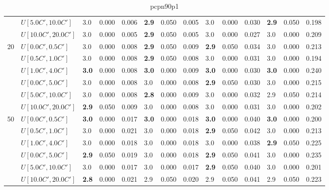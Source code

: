 \begin{table}[h]
{\begin{tabular}{|l|l||l|l|l||l|l|l||l|l|l||l|l|l|}
       & $U[5.0C',10.0C']$ & 3.0 & 0.000 & 0.006 & \textbf{2.9} & 0.050 & 0.005 & 3.0 & 0.000 & 0.030 & \textbf{2.9} & 0.050 & 0.198 \\
       & $U[10.0C',20.0C']$ & 3.0 & 0.000 & 0.005 & \textbf{2.9} & 0.050 & 0.005 & 3.0 & 0.000 & 0.027 & 3.0 & 0.000 & 0.209 \\
      \hline\hline
      \multirow{6}{*}{20} & $U[0.0C',0.5C']$ & 3.0 & 0.000 & 0.008 & \textbf{2.9} & 0.050 & 0.009 & \textbf{2.9} & 0.050 & 0.034 & 3.0 & 0.000 & 0.213 \\
       & $U[0.5C',1.0C']$ & 3.0 & 0.000 & 0.008 & \textbf{2.9} & 0.050 & 0.008 & 3.0 & 0.000 & 0.031 & 3.0 & 0.000 & 0.194 \\
       & $U[1.0C',4.0C']$ & \textbf{3.0} & 0.000 & 0.008 & \textbf{3.0} & 0.000 & 0.009 & \textbf{3.0} & 0.000 & 0.030 & \textbf{3.0} & 0.000 & 0.240 \\
       & $U[0.0C',5.0C']$ & 3.0 & 0.000 & 0.008 & 3.0 & 0.000 & 0.008 & \textbf{2.9} & 0.050 & 0.030 & 3.0 & 0.000 & 0.215 \\
       & $U[5.0C',10.0C']$ & 3.0 & 0.000 & 0.008 & \textbf{2.8} & 0.000 & 0.009 & 3.0 & 0.000 & 0.032 & 2.9 & 0.050 & 0.214 \\
       & $U[10.0C',20.0C']$ & \textbf{2.9} & 0.050 & 0.009 & 3.0 & 0.000 & 0.008 & 3.0 & 0.000 & 0.031 & 3.0 & 0.000 & 0.202 \\
      \hline\hline
      \multirow{6}{*}{50} & $U[0.0C',0.5C']$ & \textbf{3.0} & 0.000 & 0.017 & \textbf{3.0} & 0.000 & 0.018 & \textbf{3.0} & 0.000 & 0.040 & \textbf{3.0} & 0.000 & 0.200 \\
       & $U[0.5C',1.0C']$ & 3.0 & 0.000 & 0.021 & 3.0 & 0.000 & 0.018 & \textbf{2.9} & 0.050 & 0.042 & 3.0 & 0.000 & 0.213 \\
       & $U[1.0C',4.0C']$ & 3.0 & 0.000 & 0.018 & 3.0 & 0.000 & 0.018 & 3.0 & 0.000 & 0.038 & \textbf{2.9} & 0.050 & 0.225 \\
       & $U[0.0C',5.0C']$ & \textbf{2.9} & 0.050 & 0.019 & 3.0 & 0.000 & 0.018 & \textbf{2.9} & 0.050 & 0.041 & 3.0 & 0.000 & 0.235 \\
       & $U[5.0C',10.0C']$ & 3.0 & 0.000 & 0.017 & 3.0 & 0.000 & 0.017 & \textbf{2.9} & 0.050 & 0.040 & 3.0 & 0.000 & 0.201 \\
       & $U[10.0C',20.0C']$ & \textbf{2.8} & 0.000 & 0.021 & 2.9 & 0.050 & 0.020 & 2.9 & 0.050 & 0.041 & 2.9 & 0.050 & 0.223 \\
      \hline
      \end{tabular}
      }
      \caption{pcpn90p1}
      \label{tab:pcpn90p1}
	  \end{table}
      
